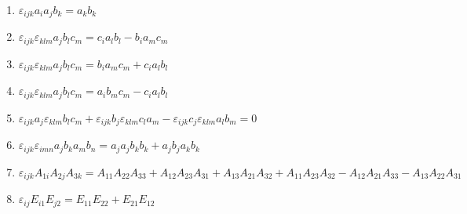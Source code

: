 \documentclass[11pt,a4paper]{article}
\begin{document}
\begin{enumerate}
\item $\displaystyle \varepsilon_{ijk} a_{i} a_{j} b_{k} = a_{k} b_{k}$
\item $\displaystyle \varepsilon_{ijk}\varepsilon_{klm} a_{j} b_{l} c_{m} = c_{i} a_{l} b_{l} - b_{i} a_{m} c_{m}$
\item $\displaystyle \varepsilon_{ijk}\varepsilon_{klm} a_{j} b_{l} c_{m} = b_{i} a_{m} c_{m} + c_{i} a_{l} b_{l}$
\item $\displaystyle \varepsilon_{ijk}\varepsilon_{klm} a_{j} b_{l} c_{m} = a_{i} b_{m} c_{m} - c_{i} a_{l} b_{l}$
\item $\displaystyle \varepsilon_{ijk} a_{j}\varepsilon_{klm} b_{l} c_{m} + \varepsilon_{ijk} b_{j}\varepsilon_{klm} c_{l} a_{m} - \varepsilon_{ijk} c_{j}\varepsilon_{klm} a_{l} b_{m} = 0$
\item $\displaystyle \varepsilon_{ijk}\varepsilon_{imn} a_{j} b_{k} a_{m} b_{n} = a_{j} a_{j} b_{k} b_{k} + a_{j} b_{j} a_{k} b_{k}$
\item $\displaystyle \varepsilon_{ijk} A_{1i} A_{2j} A_{3k} = A_{11} A_{22} A_{33} + A_{12} A_{23} A_{31} + A_{13} A_{21} A_{32} + A_{11} A_{23} A_{32} - A_{12} A_{21} A_{33} - A_{13} A_{22} A_{31}$
\item $\displaystyle \varepsilon_{ij} E_{i1} E_{j2} = E_{11} E_{22} + E_{21} E_{12}$
\end{enumerate}
\end{document}
